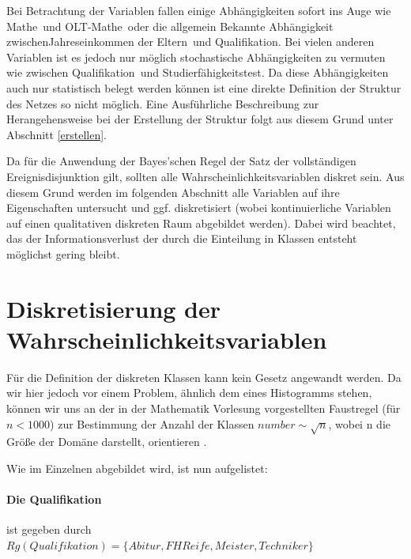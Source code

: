 Bei Betrachtung der Variablen fallen einige Abhängigkeiten sofort ins Auge wie \glqq Mathe\grqq \ und \glqq OLT-Mathe\grqq \ oder die allgemein Bekannte Abhängigkeit zwischen\glqq Jahreseinkommen der Eltern\grqq \ und \glqq Qualifikation\grqq. Bei vielen anderen Variablen ist es jedoch nur möglich stochastische Abhängigkeiten zu vermuten wie zwischen \glqq Qualifikation\grqq \ und \glqq Studierfähigkeitstest\grqq. Da diese Abhängigkeiten auch nur statistisch belegt werden können ist eine direkte Definition der Struktur des Netzes so nicht möglich. Eine Ausführliche Beschreibung zur Herangehensweise bei der Erstellung der Struktur folgt aus diesem Grund unter Abschnitt \ref{erstellen}. 
  
Da für die Anwendung der Bayes’schen Regel der Satz der vollständigen Ereignisdisjunktion gilt, sollten alle Wahrscheinlichkeitsvariablen diskret sein. Aus diesem Grund werden im folgenden Abschnitt alle Variablen auf ihre Eigenschaften untersucht und ggf. diskretisiert (wobei kontinuierliche Variablen auf einen qualitativen diskreten Raum abgebildet werden). Dabei wird beachtet, das der Informationsverlust der durch die Einteilung in Klassen entsteht möglichst gering bleibt. 


\section{Diskretisierung der Wahrscheinlichkeitsvariablen}
Für die Definition der diskreten Klassen kann kein Gesetz angewandt werden. Da wir hier jedoch vor einem Problem, ähnlich dem eines Histogramms stehen, können wir uns an der in der Mathematik Vorlesung vorgestellten Faustregel (für $n<1000$) zur Bestimmung der Anzahl der Klassen $number \sim \sqrt{n}$,  wobei n die Größe der Domäne darstellt, orientieren \parencite{kloess}.

Wie im Einzelnen abgebildet wird, ist nun aufgelistet:

\paragraph{Die Qualifikation} ist gegeben durch \\
$Rg(Qualifikation)=\{Abitur, FH Reife, Meister, Techniker\}$
